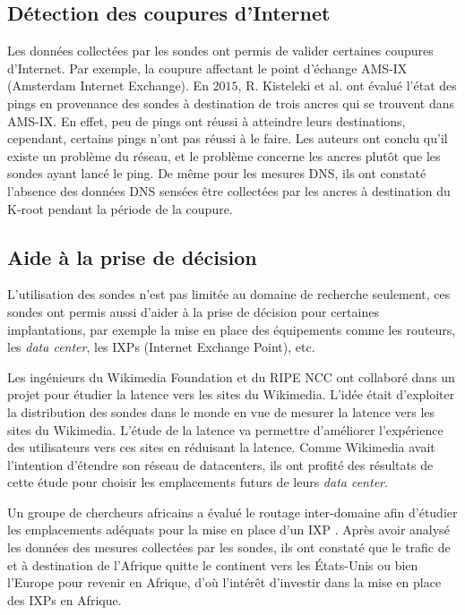 \subsection{Détection des coupures d'Internet}

Les données collectées par les sondes  ont permis de valider certaines coupures d'Internet. Par exemple, la coupure affectant le point d'échange AMS-IX (Amsterdam Internet Exchange). En $2015$, R. Kisteleki  et al. \cite{Robert-Kisteleki}  ont évalué l'état des pings en provenance des sondes  à destination de trois ancres  qui se trouvent dans AMS-IX. En effet, peu de pings ont réussi à atteindre leurs destinations, cependant, certains pings n'ont pas réussi à le faire. 
Les auteurs ont conclu qu'il existe un problème du réseau, et le problème concerne  les ancres plutôt que les sondes ayant lancé le ping. De même pour les mesures DNS, ils ont constaté l'absence des données DNS sensées être collectées par les ancres  à destination du K-root pendant la période de la coupure.



\subsection{Aide à la prise de décision}
L'utilisation des sondes  n'est pas limitée au domaine de recherche seulement,  ces sondes ont permis aussi d'aider à la prise de décision pour certaines implantations, par exemple la mise en place des équipements comme les routeurs, les \textit{data center}, les IXPs (Internet Exchange Point), etc. 

Les ingénieurs du Wikimedia Foundation et du RIPE NCC ont collaboré dans un projet \cite{Wikipedia} pour étudier la  latence vers les sites  du Wikimedia. L'idée était d'exploiter la distribution des sondes   dans le monde en vue  de mesurer la latence vers les sites du Wikimedia. L'étude de la latence va permettre d'améliorer l'expérience des utilisateurs vers ces sites  en réduisant la latence. Comme Wikimedia avait l'intention d'étendre son réseau de datacenters, ils ont profité des résultats de cette étude pour choisir les  emplacements futurs de leurs \textit{data center}.


Un groupe de chercheurs africains a évalué le routage inter-domaine afin d'étudier les emplacements adéquats pour la mise en place d'un IXP \cite{FANOU-Roderick}. Après avoir analysé les données des mesures collectées par les sondes, ils ont constaté que le trafic de et à destination de l'Afrique quitte le continent vers les États-Unis ou bien  l'Europe pour revenir en Afrique, d'où l'intérêt d'investir dans la mise en place des IXPs en Afrique.  \par



